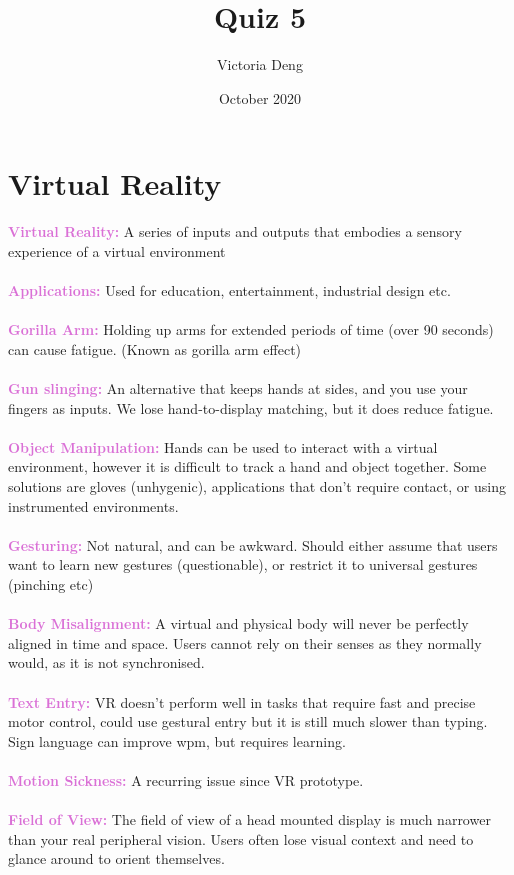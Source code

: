\documentclass[a4paper,10pt]{article}
\title{Quiz 5}
\author {Victoria Deng}
\date{\small October 2020}
\begin{document}
\maketitle 
\section*{Virtual Reality}
\textcolor{Orchid}{\textbf{Virtual Reality:}} A series of inputs and outputs that embodies a sensory experience of a virtual environment\\\\
\textcolor{Orchid}{\textbf{Applications:}} Used for education, entertainment, industrial design etc. \\\\
\textcolor{Orchid}{\textbf{Gorilla Arm:}} Holding up arms for extended periods of time (over 90 seconds) can cause fatigue. (Known as gorilla arm effect)\\\\
\textcolor{Orchid}{\textbf{Gun slinging:}} An alternative that keeps hands at sides, and you use your fingers as inputs. We lose hand-to-display matching, but it does reduce fatigue.\\\\
\textcolor{Orchid}{\textbf{Object Manipulation:}} Hands can be used to interact with a virtual environment, however it is difficult to track a hand and object together. Some solutions are gloves (unhygenic), applications that don't require contact, or using instrumented environments.\\\\
\textcolor{Orchid}{\textbf{Gesturing:}} Not natural, and can be awkward. Should either assume that users want to learn new gestures (questionable), or restrict it to universal gestures (pinching etc)\\\\
\textcolor{Orchid}{\textbf{Body Misalignment:}} A virtual and physical body will never be perfectly aligned in time and space. Users cannot rely on their senses as they normally would, as it is not synchronised.\\\\
\textcolor{Orchid}{\textbf{Text Entry:}} VR doesn't perform well in tasks that require fast and precise motor control, could use gestural entry but it is still much slower than typing. Sign language can improve wpm, but requires learning. \\\\
\textcolor{Orchid}{\textbf{Motion Sickness:}} A recurring issue since VR prototype. \\\\
\textcolor{Orchid}{\textbf{Field of View:}} The field of view of a head mounted display is much narrower than your real peripheral vision. Users often lose visual context and need to glance around to orient themselves.\\\\

\textcolor{Orchid}{\textbf{}}\\\\
\textcolor{Orchid}{\textbf{}}\\\\
\textcolor{Orchid}{\textbf{}}\\\\
\end{document}

